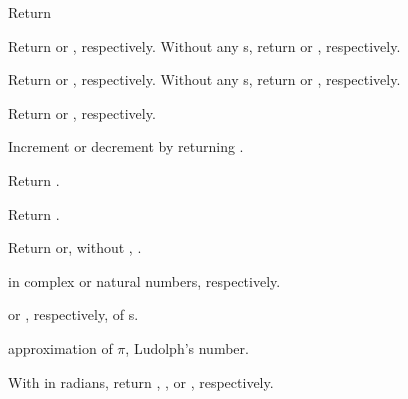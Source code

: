 \begin{LIST}{1cm}

  {
  Return 
  }

  {
  Return  or , respectively. Without any
  s, return  or , respectively.
  }

  {
  Return  or , respectively. Without any
  s, return  or , respectively.
  }

  {Return  or
  , respectively.
  }

  {
  Increment or
  decrement  by  returning .
  }

  {Return .
    }

  {Return .
    }

  {
  Return  or,
  without , .
  }

  {
     in complex or natural numbers, respectively.
  }

  {
   or , respectively, of s. 
  }

  {
   approximation of $\pi$, Ludolph's number.
  }

  {
  With  in radians, return , , or , respectively.
  }


\end{LIST}
